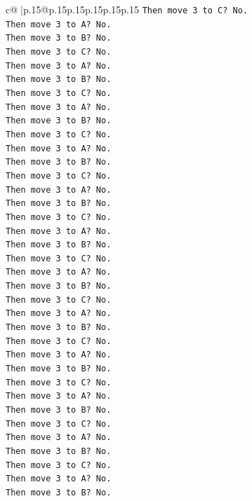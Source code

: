 \documentclass{article}
\begin{document}
{\begin{supertabular}{c@{$\;$}|p{.15\linewidth}@{}p{.15\linewidth}p{.15\linewidth}p{.15\linewidth}p{.15\linewidth}p{.15\linewidth}}
{{{\texttt{Then move 3 to C? No.} \\
\texttt{Then move 3 to A? No.} \\
\texttt{Then move 3 to B? No.} \\
\texttt{Then move 3 to C? No.} \\
\texttt{Then move 3 to A? No.} \\
\texttt{Then move 3 to B? No.} \\
\texttt{Then move 3 to C? No.} \\
\texttt{Then move 3 to A? No.} \\
\texttt{Then move 3 to B? No.} \\
\texttt{Then move 3 to C? No.} \\
\texttt{Then move 3 to A? No.} \\
\texttt{Then move 3 to B? No.} \\
\texttt{Then move 3 to C? No.} \\
\texttt{Then move 3 to A? No.} \\
\texttt{Then move 3 to B? No.} \\
\texttt{Then move 3 to C? No.} \\
\texttt{Then move 3 to A? No.} \\
\texttt{Then move 3 to B? No.} \\
\texttt{Then move 3 to C? No.} \\
\texttt{Then move 3 to A? No.} \\
\texttt{Then move 3 to B? No.} \\
\texttt{Then move 3 to C? No.} \\
\texttt{Then move 3 to A? No.} \\
\texttt{Then move 3 to B? No.} \\
\texttt{Then move 3 to C? No.} \\
\texttt{Then move 3 to A? No.} \\
\texttt{Then move 3 to B? No.} \\
\texttt{Then move 3 to C? No.} \\
\texttt{Then move 3 to A? No.} \\
\texttt{Then move 3 to B? No.} \\
\texttt{Then move 3 to C? No.} \\
\texttt{Then move 3 to A? No.} \\
\texttt{Then move 3 to B? No.} \\
\texttt{Then move 3 to C? No.} \\
\texttt{Then move 3 to A? No.} \\
\texttt{Then move 3 to B? No.} \\
}}}
\end{supertabular}}
\end{document}
